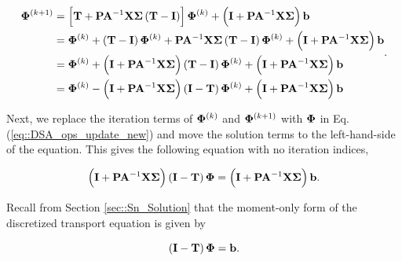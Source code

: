 \begin{equation}
\label{eq::DSA_ops_update_new}
\begin{aligned}
{\bf \Phi}^{(k+1)} &= \left[ {\bf T}  + {\bf P} {\bf A}^{-1} {\bf X} {\bf \Sigma} \left(  {\bf T}    - {\bf I} \right) \right] {\bf \Phi}^{(k)}  + \left( {\bf I}+ {\bf P} {\bf A}^{-1}  {\bf X} {\bf \Sigma}   \right) {\bf b} \\ 
&= {\bf \Phi}^{(k)}  + \left( {\bf T}-  {\bf I} \right){\bf \Phi}^{(k)}   + {\bf P} {\bf A}^{-1} {\bf X} {\bf \Sigma} \left(  {\bf T}    - {\bf I} \right) {\bf \Phi}^{(k)}  + \left( {\bf I} + {\bf P} {\bf A}^{-1}  {\bf X} {\bf \Sigma} \right) {\bf b} \\
&= {\bf \Phi}^{(k)} + \left( {\bf I} + {\bf P} {\bf A}^{-1} {\bf X} {\bf \Sigma} \right) \left(  {\bf T}    - {\bf I} \right) {\bf \Phi}^{(k)}  + \left( {\bf I}+ {\bf P} {\bf A}^{-1}  {\bf X} {\bf \Sigma}   \right) {\bf b} \\
&= {\bf \Phi}^{(k)} - \left( {\bf I} + {\bf P} {\bf A}^{-1} {\bf X} {\bf \Sigma} \right) \left(  {\bf I}    - {\bf T} \right) {\bf \Phi}^{(k)}  + \left({\bf I}+  {\bf P} {\bf A}^{-1}  {\bf X} {\bf \Sigma}   \right) {\bf b}
\end{aligned} .
\end{equation}

\noindent Next, we replace the iteration terms of ${\bf \Phi}^{(k)}$ and ${\bf \Phi}^{(k+1)}$ with ${\bf \Phi}$  in Eq. (\ref{eq::DSA_ops_update_new}) and move the solution terms to the left-hand-side of the equation. This gives the following equation with no iteration indices,

\begin{equation}
\label{eq::DSA_ops_prec_rich}
\left( {\bf I} + {\bf P} {\bf A}^{-1} {\bf X} {\bf \Sigma} \right) \left(  {\bf I}    - {\bf T} \right) {\bf \Phi} =  \left({\bf I}+  {\bf P} {\bf A}^{-1}  {\bf X} {\bf \Sigma}   \right) {\bf b} .
\end{equation}

\noindent Recall from Section \ref{sec::Sn_Solution} that the moment-only form of the discretized transport equation is given by 

\begin{equation}
\label{eq::DSA_ops_rich}
 \left(  {\bf I}    - {\bf T} \right) {\bf \Phi} =   {\bf b} .
\end{equation}

